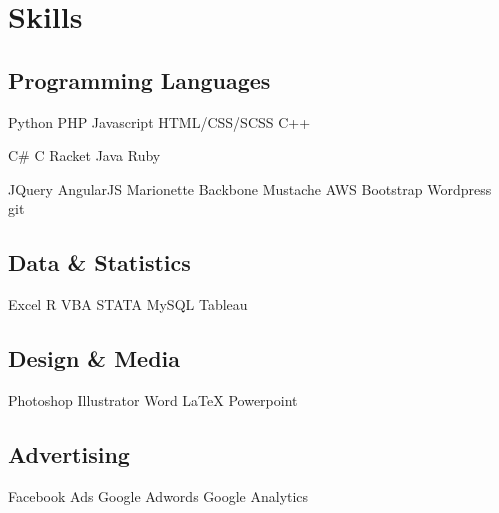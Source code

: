 \section{Skills}
\subsection{Programming Languages}

Python \textbullet{} PHP \textbullet{} Javascript \textbullet{} HTML/CSS/SCSS \textbullet{} C++ \\
\sectionsep

C\# \textbullet{} C \textbullet{} Racket \textbullet{} Java \textbullet{} Ruby 
\sectionsep

JQuery \textbullet{} AngularJS \textbullet{} Marionette \textbullet{} Backbone \textbullet{} Mustache \textbullet{} AWS \textbullet{} Bootstrap \textbullet{} Wordpress \textbullet{} git
\sectionsep

\subsection{Data \& Statistics}
Excel \textbullet{} R \textbullet{} VBA \textbullet{} STATA \textbullet{} MySQL \textbullet{} Tableau\\
\sectionsep

\subsection{Design \& Media}
Photoshop \textbullet{} Illustrator \textbullet{} Word \textbullet{} LaTeX \textbullet{} Powerpoint \\
\sectionsep

\subsection{Advertising}
Facebook Ads \textbullet{} Google Adwords \textbullet{} Google Analytics \\
\sectionsep
